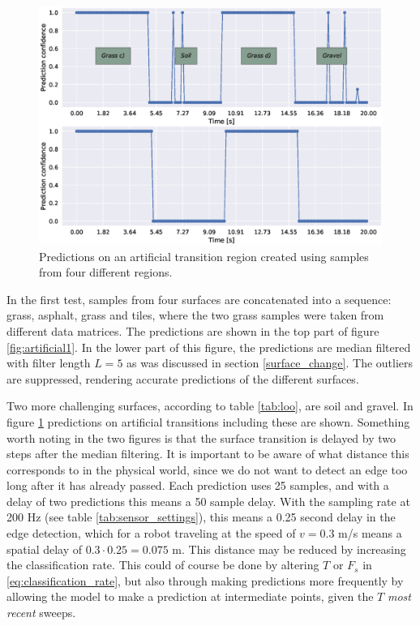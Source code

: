 \begin{figure}[t]
	\centering
	\includegraphics[scale=0.5]{figs_temp/varmats2}
	\caption{Predictions on an artificial transition region created using samples from four different regions.}
	\label{fig:artificial2}
\end{figure}

In the first test, samples from four surfaces are concatenated into a sequence: grass, asphalt, grass and tiles, where the two grass samples were taken from different data matrices. The predictions are shown in the top part of figure \ref{fig:artificial1}. In the lower part of this figure, the predictions are median filtered with filter length $L=5$ as was discussed in section \ref{surface_change}. The outliers are suppressed, rendering accurate predictions of the different surfaces. 

Two more challenging surfaces, according to table \ref{tab:loo}, are soil and gravel. In figure \ref{fig:artificial2} predictions on artificial transitions including these are shown. Something worth noting in the two figures is that the surface transition is delayed by two steps after the median filtering. It is important to be aware of what distance this corresponds to in the physical world, since we do not want to detect an edge too long after it has already passed. Each prediction uses 25 samples, and with a delay of two predictions this means a 50 sample delay. With the sampling rate at 200 Hz (see table \ref{tab:sensor_settings}), this means a 0.25 second delay in the edge detection, which for a robot traveling at the speed of $v=0.3$ m/s means a spatial delay of $0.3\cdot0.25=0.075$ m. This distance may be reduced by increasing the classification rate. This could of course be done by altering $T$ or $F_s$ in \eqref{eq:classification_rate}, but also through making predictions more frequently by allowing the model to make a prediction at intermediate points, given the $T$ \emph{most recent} sweeps.

